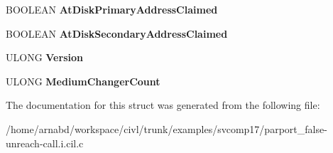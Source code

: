 \begin{DoxyCompactItemize}
\item 
\hypertarget{struct__CONFIGURATION__INFORMATION_a4aa9e71c5f85db06b82b9879f7eda16a}{}B\+O\+O\+L\+E\+A\+N {\bfseries At\+Disk\+Primary\+Address\+Claimed}\label{struct__CONFIGURATION__INFORMATION_a4aa9e71c5f85db06b82b9879f7eda16a}

\item 
\hypertarget{struct__CONFIGURATION__INFORMATION_adc8db1dbb970ae859959e7fb4ba73191}{}B\+O\+O\+L\+E\+A\+N {\bfseries At\+Disk\+Secondary\+Address\+Claimed}\label{struct__CONFIGURATION__INFORMATION_adc8db1dbb970ae859959e7fb4ba73191}

\item 
\hypertarget{struct__CONFIGURATION__INFORMATION_a034eecf9fbeb87b60354dc5cde0156cc}{}U\+L\+O\+N\+G {\bfseries Version}\label{struct__CONFIGURATION__INFORMATION_a034eecf9fbeb87b60354dc5cde0156cc}

\item 
\hypertarget{struct__CONFIGURATION__INFORMATION_af19453bf05bbdbc1ecc9c796acd8ecc9}{}U\+L\+O\+N\+G {\bfseries Medium\+Changer\+Count}\label{struct__CONFIGURATION__INFORMATION_af19453bf05bbdbc1ecc9c796acd8ecc9}

\end{DoxyCompactItemize}


The documentation for this struct was generated from the following file\+:\begin{DoxyCompactItemize}
\item 
/home/arnabd/workspace/civl/trunk/examples/svcomp17/parport\+\_\+false-\/unreach-\/call.\+i.\+cil.\+c\end{DoxyCompactItemize}
